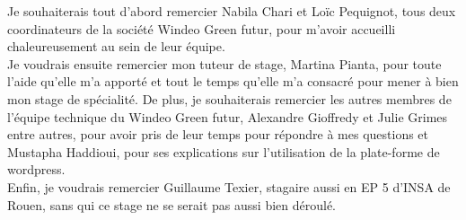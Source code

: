 Je souhaiterais tout d'abord remercier Nabila Chari et Loïc Pequignot, tous deux coordinateurs de la société Windeo Green futur, pour m'avoir accueilli chaleureusement au sein de leur équipe.\\

Je voudrais ensuite remercier mon tuteur de stage, Martina Pianta, pour toute l'aide qu'elle m'a apporté et tout le temps qu'elle m'a consacré pour mener à bien mon stage de spécialité. De plus, je souhaiterais remercier les autres membres de l'équipe technique du Windeo Green futur, Alexandre Gioffredy et Julie Grimes entre autres, pour avoir pris de leur temps pour répondre à mes questions et Mustapha Haddioui, pour ses explications sur l'utilisation de la plate-forme de wordpress.\\

Enfin, je voudrais remercier Guillaume Texier, stagaire aussi en EP 5 d'INSA de Rouen, sans qui ce stage ne se serait pas aussi bien déroulé. 
